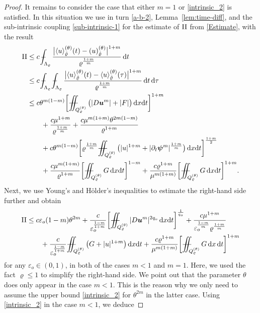 \documentclass[a4paper, 10pt, american]{amsart}
\numberwithin{theorem}{section}
\numberwithin{equation}{section}
\newcommand{\dxdt}{\,\mathrm{d}x\mathrm{d}t}
\renewcommand{\d}{\,\mathrm{d}}
\newcommand{\dx}{\,\mathrm{d}x}
\newcommand{\dt}{\,\mathrm{d}t}
\renewcommand{\epsilon}{\varepsilon}
\renewcommand{\epsilon}{\varepsilon}
\renewcommand{\rho}{\varrho}
\newcommand{\power}[2]{\bm{#1^{\mbox{\unboldmath{\scriptsize$#2$}}}}}
\def\Xint#1{\mathchoice
    {\XXint\displaystyle\textstyle{#1}}%
    {\XXint\textstyle\scriptstyle{#1}}%
    {\XXint\scriptstyle\scriptscriptstyle{#1}}%
    {\XXint\scriptscriptstyle\scriptscriptstyle{#1}}%
    \!\int}
\def\XXint#1#2#3{\setbox0=\hbox{$#1{#2#3}{\int}$}
    \vcenter{\hbox{$#2#3$}}\kern-0.5\wd0}
\def\bint{\Xint-}
\def\Xiint#1{\mathchoice
    {\XXiint\displaystyle\textstyle{#1}}%
    {\XXiint\textstyle\scriptstyle{#1}}%
    {\XXiint\scriptstyle\scriptscriptstyle{#1}}%
    {\XXiint\scriptscriptstyle\scriptscriptstyle{#1}}%
    \!\iint}
\def\XXiint#1#2#3{\setbox0=\hbox{$#1{#2#3}{\iint}$}
    \vcenter{\hbox{$#2#3$}}\kern-0.5\wd0}
\def\biint{\Xiint{-\!-}}
\def\<{\langle}
\def\>{\rangle}
\begin{document}
\begin{proof}
It remains to consider the case that
either $m=1$ or \eqref{intrinsic_2} is satisfied.
In this situation
we use in turn \eqref{a-b-2}, Lemma~\ref{lem:time-diff}, and
the sub-intrinsic coupling \eqref{sub-intrinsic-1} for the estimate of ${\rm{II}}$ from
\eqref{Estimate}, with the result 
\begin{align}
\nonumber
{\rm{II}}
&\le
c\,  \bint_{\Lambda_\rho}\frac{\big| \<u\>_{\hat{\rho}}^{(\theta)}(t) - (u)_{\hat{\rho}}^{(\theta)} \big|^{1+m}}{\rho^{\frac{1+m}m} } \dt\\\nonumber
&\le
c\,  \bint_{\Lambda_\rho}\bint_{\Lambda_\rho}\frac{\big| \<u\>_{\hat{\rho}}^{(\theta)}(t) - \<u\>_{\hat{\rho}}^{(\theta)}(\tau) \big|^{1+m}}{\rho^{\frac{1+m}m} } \dt\d\tau\\\nonumber
&\le
c\theta^{m(1-m)}\bigg[ \biint_{Q_\rho^{(\theta)}} \big(|D\power um|+|F|\big) \dxdt\bigg]^{1+m} \\\nonumber
&\qquad+
\frac{c\mu^{1+m}}{\rho^{\frac{1+m}m}}
+
\frac{c\mu^{m(1+m)}\theta^{2m(1-m)}}{\rho^{1+m}} \\\nonumber
&\qquad+
c\theta^{m(1-m)}
\bigg[\rho^\frac{1+m}m \biint_{Q_\rho^{(\theta)}}\big(|u|^{1+m}+
|\partial_t \power \psi m|^{\frac{1+m}{m}}
\big)\dxdt\bigg]^{\frac{1+m}2} \\
&\qquad+ 
\frac{c\mu^{m(1+m)}}{\rho^{1+m}}
\bigg[\biint_{Q_\rho^{(\theta)}} G\dxdt\bigg]^{1-m}
+
  \frac{c\rho^{1+m}}{\mu^{m(1+m)}}
  \bigg[ \biint_{Q_\rho^{(\theta)}}G\dxdt \bigg]^{1+m}.
\end{align}
Next, we use Young's and H\"older's inequalities to
estimate the right-hand side further and obtain 
\begin{align}\label{ii2}
\nonumber
{\rm{II}}
&\le
c\epsilon_o(1-m) \theta^{2m}
+
 \frac{c}{\epsilon_o^{\frac{1-m}{1+m}}} \bigg[\biint_{Q_\rho^{(\theta)}} |D\power um|^{2q_o}\dxdt\bigg]^{\frac1{q_o}}
+
\frac{c\mu^{1+m}}{\epsilon_o^{\frac{1-m}m}\rho^{\frac{1+m}m}}  \\
&\qquad+
\frac{c}{\epsilon_o^{\frac{1-m}{1+m}}}\biint_{Q_\rho^{(\theta)}}
\big(G + |u|^{1+m}\big) \dxdt 
+
 \frac{c\rho^{1+m}}{\mu^{m(1+m)}}
  \bigg[ \biint_{Q_\rho^{(\theta)}}
  G\dx\dt \bigg]^{1+m}
\end{align}
for any $\epsilon_o\in(0,1)$, in both of the cases $m<1$ and $m=1$. Here, we used the fact $\rho\le1$ to
simplify the right-hand side.
We point out that the parameter $\theta$ does only appear in the case
$m<1$. This is the reason why we only need to assume the upper bound
\eqref{intrinsic_2} for $\theta^{2m}$ in the latter case.
Using \eqref{intrinsic_2} in the case $m<1$, we deduce

\end{proof}
\end{document}
